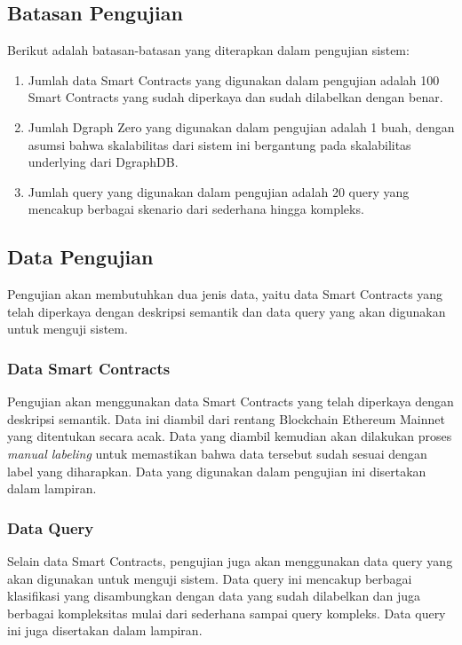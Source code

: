 \subsection{Batasan Pengujian}

Berikut adalah batasan-batasan yang diterapkan dalam pengujian sistem:
\begin{enumerate}
    \item Jumlah data Smart Contracts yang digunakan dalam pengujian adalah 100 Smart Contracts yang sudah diperkaya dan sudah dilabelkan dengan benar.
    \item Jumlah Dgraph Zero yang digunakan dalam pengujian adalah 1 buah, dengan asumsi bahwa skalabilitas dari sistem ini bergantung pada skalabilitas underlying dari DgraphDB.
    \item Jumlah query yang digunakan dalam pengujian adalah 20 query yang mencakup berbagai skenario dari sederhana hingga kompleks.
\end{enumerate}


\subsection{Data Pengujian}

Pengujian akan membutuhkan dua jenis data, yaitu data Smart Contracts yang telah diperkaya dengan deskripsi semantik dan data query yang akan digunakan untuk menguji sistem.

\subsubsection{Data Smart Contracts}

Pengujian akan menggunakan data Smart Contracts yang telah diperkaya dengan deskripsi semantik. Data ini diambil dari rentang Blockchain Ethereum Mainnet yang ditentukan secara acak. Data yang diambil kemudian akan dilakukan proses \textit{manual labeling} untuk memastikan bahwa data tersebut sudah sesuai dengan label yang diharapkan. Data yang digunakan dalam pengujian ini disertakan dalam lampiran.

\subsubsection{Data Query}

Selain data Smart Contracts, pengujian juga akan menggunakan data query yang akan digunakan untuk menguji sistem. Data query ini mencakup berbagai klasifikasi yang disambungkan dengan data yang sudah dilabelkan dan juga berbagai kompleksitas mulai dari sederhana sampai query kompleks. Data query ini juga disertakan dalam lampiran.


